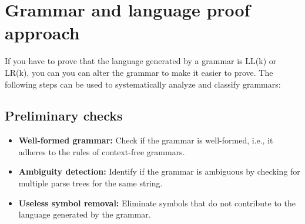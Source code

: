 







\section{Grammar and language proof approach}
If you have to prove that the language generated by a grammar is LL(k) or LR(k), you can you can alter the grammar to make it easier to prove. The following steps can be used to systematically analyze and classify grammars:

\subsection{Preliminary checks}
\begin{itemize}
    \item \textbf{Well-formed grammar:} Check if the grammar is well-formed, i.e., it adheres to the rules of context-free grammars.
    \item \textbf{Ambiguity detection:} Identify if the grammar is ambiguous by checking for multiple parse trees for the same string.
    \item \textbf{Useless symbol removal:} Eliminate symbols that do not contribute to the language generated by the grammar.
\end{itemize}
